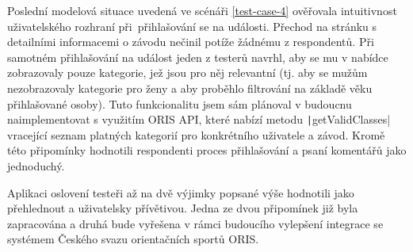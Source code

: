 Poslední modelová situace uvedená ve scénáři \ref{test-case-4} ověřovala intuitivnost uživatelského rozhraní při~přihlašování se na události. Přechod na stránku s detailními informacemi o závodu nečinil potíže žádnému z respondentů. Při samotném přihlašování na událost jeden z testerů navrhl, aby se mu v nabídce zobrazovaly pouze kategorie, jež jsou pro něj relevantní (tj. aby se mužům nezobrazovaly kategorie pro ženy a aby proběhlo filtrování na základě věku přihlašované osoby). Tuto funkcionalitu jsem sám plánoval v budoucnu naimplementovat s využitím ORIS API, které nabízí metodu \texttt|getValidClasses| vracející seznam platných kategorií pro konkrétního uživatele a závod. Kromě této připomínky hodnotili respondenti proces přihlašování a psaní komentářů jako jednoduchý.

Aplikaci oslovení testeři až na dvě výjimky popsané výše hodnotili jako přehlednout a uživatelsky přívětivou. Jedna ze dvou připomínek již byla zapracována a druhá bude vyřešena v rámci budoucího vylepšení integrace se systémem Českého svazu orientačních sportů ORIS.
